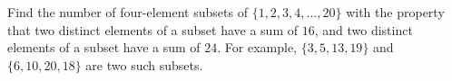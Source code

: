 Find the number of four-element subsets of $\{1,2,3,4,\dots, 20\}$ with the property that two distinct elements of a subset have a sum of $16$, and two distinct elements of a subset have a sum of $24$. For example, $\{3,5,13,19\}$ and $\{6,10,20,18\}$ are two such subsets.